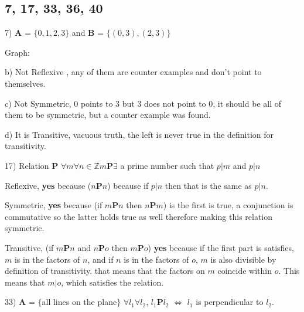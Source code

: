 \documentclass[11pt]{article}
\begin{document}
\subsection{7, 17, 33, 36, 40}
\begin{flushleft}

7) \textbf{A} = $\{ 0,1,2,3\}$ and \textbf{B} = $\{ (0,3),(2,3)\}$

Graph: 

\vspace{10mm}


b) Not Reflexive , any of them are counter examples and don't point to themselves.

c) Not Symmetric, 0 points to 3 but 3 does not point to 0, it should be all of them to be symmetric, but a counter example was found.

d) It is Transitive, vacuous truth, the left is never true in the definition for transitivity.

\hrulefill

17) Relation \textbf{P} $\forall m \forall n \in \mathbb{Z} m$\textbf{P}$ \exists$ a prime number such that $ p|m$ and $p|n$

\vspace{2mm}

Reflexive, \textbf{yes} because ($n$\textbf{P}$n$) because if $p|n$ then that is the same as $p|n$.

\vspace{2mm}

Symmetric, \textbf{yes} because (if $m$\textbf{P}$n$ then $n$\textbf{P}$m$)  is the first is true, a conjunction is commutative so the latter holds true as well therefore making this relation symmetric.

\vspace{2mm}

Transitive, (if $m$\textbf{P}$n$ and $n$\textbf{P}$o$ then $m$\textbf{P}$o$) \textbf{yes} because if the first part is satisfies, $m$ is in the factors of $n$, and if $n$ is in the factors of $o$, $m$ is also divisible by definition of transitivity. that means that the factors on $m$ coincide within $o$. This means that $m|o$, which satisfies the relation. 

\hrulefill

33) \textbf{A} = $\{$all lines on the plane$\}$ $\forall l_1 \forall l_2$, $l_1$\textbf{P}$l_2$ $ \Leftrightarrow$ $l_1$ is perpendicular to $l_2$. 

\vspace{2mm}


\end{flushleft}
\end{document}
